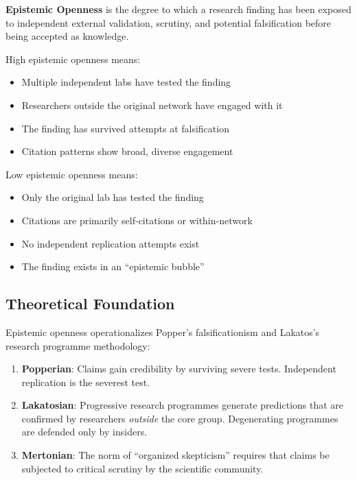 \documentclass[11pt,a4paper]{article}
\begin{document}
\begin{definitionbox}[title={Epistemic Openness}]
\textbf{Epistemic Openness} is the degree to which a research finding has been exposed to independent external validation, scrutiny, and potential falsification before being accepted as knowledge.

High epistemic openness means:
\begin{itemize}
    \item Multiple independent labs have tested the finding
    \item Researchers outside the original network have engaged with it
    \item The finding has survived attempts at falsification
    \item Citation patterns show broad, diverse engagement
\end{itemize}

Low epistemic openness means:
\begin{itemize}
    \item Only the original lab has tested the finding
    \item Citations are primarily self-citations or within-network
    \item No independent replication attempts exist
    \item The finding exists in an ``epistemic bubble''
\end{itemize}
\end{definitionbox}

\subsection{Theoretical Foundation}

Epistemic openness operationalizes Popper's falsificationism and Lakatos's research programme methodology:

\begin{enumerate}
    \item \textbf{Popperian}: Claims gain credibility by surviving severe tests. Independent replication is the severest test.

    \item \textbf{Lakatosian}: Progressive research programmes generate predictions that are confirmed by researchers \textit{outside} the core group. Degenerating programmes are defended only by insiders.

    \item \textbf{Mertonian}: The norm of ``organized skepticism'' requires that claims be subjected to critical scrutiny by the scientific community.
\end{enumerate}
\end{document}
